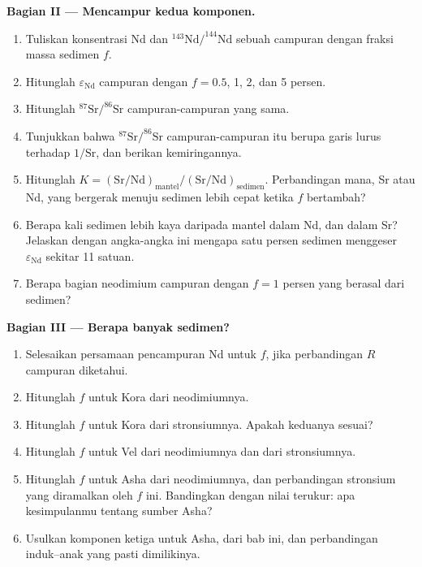 \begin{problem}
\noindent\textbf{Bagian II --- Mencampur kedua komponen.}
\begin{enumerate}[resume]
\item Tuliskan konsentrasi Nd dan $^{143}\mathrm{Nd}/^{144}\mathrm{Nd}$ sebuah
campuran dengan fraksi massa sedimen $f$.
\item Hitunglah $\varepsilon_{\mathrm{Nd}}$ campuran dengan $f = 0.5$, 1, 2, dan 5
persen.
\item Hitunglah $^{87}\mathrm{Sr}/^{86}\mathrm{Sr}$ campuran-campuran yang sama.
\item Tunjukkan bahwa $^{87}\mathrm{Sr}/^{86}\mathrm{Sr}$ campuran-campuran itu berupa garis
lurus terhadap $1/\mathrm{Sr}$, dan berikan kemiringannya.
\item Hitunglah $K = (\mathrm{Sr}/\mathrm{Nd})_{\text{mantel}}/(\mathrm{Sr}/\mathrm{Nd})_{\text{sedimen}}$.
Perbandingan mana, Sr atau Nd, yang bergerak menuju sedimen lebih cepat ketika $f$ bertambah?
\item Berapa kali sedimen lebih kaya daripada mantel dalam Nd, dan dalam Sr?
Jelaskan dengan angka-angka ini mengapa satu persen sedimen menggeser
$\varepsilon_{\mathrm{Nd}}$ sekitar 11 satuan.
\item Berapa bagian neodimium campuran dengan $f = 1$ persen yang berasal dari
sedimen?
\end{enumerate}

\noindent\textbf{Bagian III --- Berapa banyak sedimen?}
\begin{enumerate}[resume]
\item Selesaikan persamaan pencampuran Nd untuk $f$, jika perbandingan $R$ campuran diketahui.
\item Hitunglah $f$ untuk Kora dari neodimiumnya.
\item Hitunglah $f$ untuk Kora dari stronsiumnya. Apakah keduanya sesuai?
\item Hitunglah $f$ untuk Vel dari neodimiumnya dan dari stronsiumnya.
\item Hitunglah $f$ untuk Asha dari neodimiumnya, dan perbandingan stronsium yang diramalkan
oleh $f$ ini. Bandingkan dengan nilai terukur: apa kesimpulanmu tentang
sumber Asha?
\item Usulkan komponen ketiga untuk Asha, dari bab ini, dan
perbandingan induk--anak yang pasti dimilikinya.
\end{enumerate}


\end{problem}
